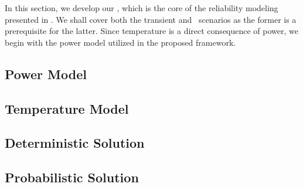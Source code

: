 In this section, we develop our \ta, which is the core of the reliability modeling presented in .
We shall cover both the transient and \dss\ scenarios as the former is a prerequisite for the latter.
Since temperature is a direct consequence of power, we begin with the power model utilized in the proposed framework.

\subsection{Power Model} 


\subsection{Temperature Model} 


\subsection{Deterministic Solution} 


\subsection{Probabilistic Solution} 

